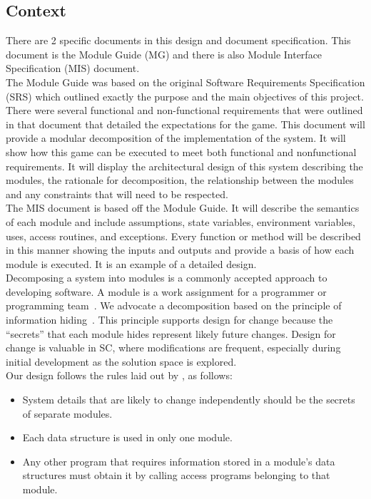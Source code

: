 \documentclass[12pt, titlepage]{article}
\begin{document}
\subsection{Context}
There are 2 specific documents in this design and document specification. This document is the Module Guide (MG) and there is also Module Interface Specification (MIS) document. 
\\
\newline The Module Guide was based on the original Software Requirements Specification (SRS) which outlined exactly the purpose and the main objectives of this project. There were several functional and non-functional requirements that were outlined in that document that detailed the expectations for the game. This document will provide a modular decomposition of the implementation of the system. It will show how this game can be executed to meet both functional and nonfunctional requirements. It will display the architectural design of this system describing the modules, the rationale for decomposition, the relationship between the modules and any constraints that will need to be respected. 
\\
\newline The MIS document is based off the Module Guide. It will describe the semantics of each module and include assumptions, state variables, environment variables, uses, access routines, and exceptions. Every function or method will be described in this manner showing the inputs and outputs and provide a basis of how each module is executed. It is an example of a detailed design. 
\\ 
\newline Decomposing a system into modules is a commonly accepted approach to developing
software.  A module is a work assignment for a programmer or programming
team~\citep{ParnasEtAl1984}.  We advocate a decomposition
based on the principle of information hiding~\citep{Parnas1972a}.  This
principle supports design for change because the ``secrets'' that each module
hides represent likely future changes.  Design for change is valuable in SC,
where modifications are frequent, especially during initial development as the
solution space is explored.  
\\
\newline Our design follows the rules laid out by \citet{ParnasEtAl1984}, as follows:

\begin{itemize}
\item System details that are likely to change independently should be the
  secrets of separate modules.
\item Each data structure is used in only one module.
\item Any other program that requires information stored in a module's data
  structures must obtain it by calling access programs belonging to that module.
\end{itemize}
\end{document}
